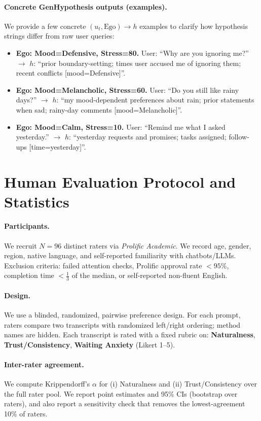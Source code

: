 \documentclass{article}
\begin{document}
\paragraph{Concrete GenHypothesis outputs (examples).}
We provide a few concrete $(u_t, \text{Ego})\rightarrow h$ examples to clarify how hypothesis strings differ from raw user queries:
\begin{itemize}
  \item \textbf{Ego: Mood=Defensive, Stress=80.} User: ``Why are you ignoring me?'' $\rightarrow$ $h$: ``prior boundary-setting; times user accused me of ignoring them; recent conflicts [mood=Defensive]''.
  \item \textbf{Ego: Mood=Melancholic, Stress=60.} User: ``Do you still like rainy days?'' $\rightarrow$ $h$: ``my mood-dependent preferences about rain; prior statements when sad; rainy-day comments [mood=Melancholic]''.
  \item \textbf{Ego: Mood=Calm, Stress=10.} User: ``Remind me what I asked yesterday.'' $\rightarrow$ $h$: ``yesterday requests and promises; tasks assigned; follow-ups [time=yesterday]''.
\end{itemize}

\section{Human Evaluation Protocol and Statistics}
\label{app:human-eval}

\paragraph{Participants.}
We recruit \textbf{$N=96$} distinct raters via \emph{Prolific Academic}. We record age, gender, region, native language, and self-reported familiarity with chatbots/LLMs. Exclusion criteria: failed attention checks, Prolific approval rate $<95\%$, completion time $<\tfrac{1}{3}$ of the median, or self-reported non-fluent English.

\paragraph{Design.}
We use a blinded, randomized, pairwise preference design. For each prompt, raters compare two transcripts with randomized left/right ordering; method names are hidden. Each transcript is rated with a fixed rubric on:
\textbf{Naturalness}, \textbf{Trust/Consistency}, \textbf{Waiting Anxiety} (Likert 1--5).

\paragraph{Inter-rater agreement.}
We compute Krippendorff's $\alpha$ for (i) Naturalness and (ii) Trust/Consistency over the full rater pool.
We report point estimates and 95\% CIs (bootstrap over raters), and also report a sensitivity check that removes the lowest-agreement 10\% of raters.
\end{document}
